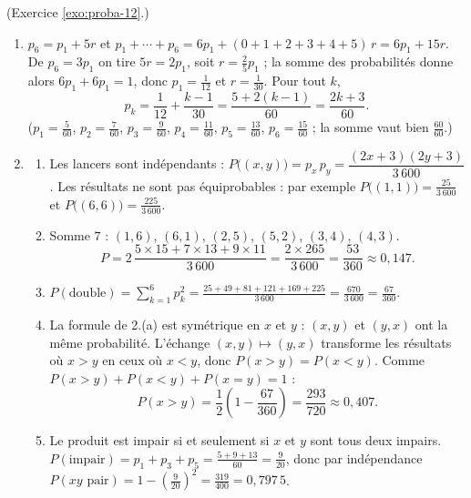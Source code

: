 \begin{corrige}
\begin{sol}
\end{sol}
%
\begin{sol} (Exercice \ref{exo:proba-12}.)
\begin{enumerate}
\item $p_6 = p_1 + 5r$ et $p_1 + \cdots + p_6 = 6p_1 + (0+1+2+3+4+5)\,r = 6p_1 + 15r$.
      De $p_6 = 3p_1$ on tire $5r = 2p_1$, soit $r = \frac{2}{5}p_1$ ; la somme des probabilit\'es donne alors
      $6p_1 + 6p_1 = 1$, donc $p_1 = \frac{1}{12}$ et $r = \frac{1}{30}$. Pour tout $k$,
      \[
      p_k = \frac{1}{12} + \frac{k-1}{30} = \frac{5 + 2(k-1)}{60} = \frac{2k+3}{60}.
      \]
      ($p_1 = \frac{5}{60}$, $p_2 = \frac{7}{60}$, $p_3 = \frac{9}{60}$, $p_4 = \frac{11}{60}$, $p_5 = \frac{13}{60}$, $p_6 = \frac{15}{60}$ ; la somme vaut bien $\frac{60}{60}$.)
\item \begin{enumerate}
      \item Les lancers sont ind\'ependants : $P\big((x,y)\big) = p_x\,p_y = \dfrac{(2x+3)(2y+3)}{3\,600}$.
            Les r\'esultats ne sont pas \'equiprobables : par exemple $P\big((1,1)\big) = \frac{25}{3\,600}$ et $P\big((6,6)\big) = \frac{225}{3\,600}$.
      \item Somme $7$ : $(1,6)$, $(6,1)$, $(2,5)$, $(5,2)$, $(3,4)$, $(4,3)$.
            \[
            P = 2\,\frac{5\times 15 + 7\times 13 + 9\times 11}{3\,600} = \frac{2\times 265}{3\,600} = \frac{53}{360}\approx 0,147.
            \]
      \item $P(\text{double}) = \sum_{k=1}^{6} p_k^2 = \frac{25 + 49 + 81 + 121 + 169 + 225}{3\,600} = \frac{670}{3\,600} = \frac{67}{360}$.
      \item La formule de 2.(a) est sym\'etrique en $x$ et $y$ : $(x,y)$ et $(y,x)$ ont la m\^eme probabilit\'e.
            L'\'echange $(x,y)\mapsto(y,x)$ transforme les r\'esultats o\`u $x > y$ en ceux o\`u $x < y$,
            donc $P(x>y) = P(x<y)$. Comme $P(x>y) + P(x<y) + P(x=y) = 1$ :
            \[
            P(x > y) = \frac{1}{2}\left(1 - \frac{67}{360}\right) = \frac{293}{720}\approx 0,407.
            \]
      \item Le produit est impair si et seulement si $x$ et $y$ sont tous deux impairs.
            $P(\text{impair}) = p_1 + p_3 + p_5 = \frac{5+9+13}{60} = \frac{9}{20}$, donc par ind\'ependance
            $P(xy \text{ pair}) = 1 - \left(\frac{9}{20}\right)^2 = \frac{319}{400} = 0,797\,5$.
      \end{enumerate}
\end{enumerate}
\end{sol}

\end{corrige}
